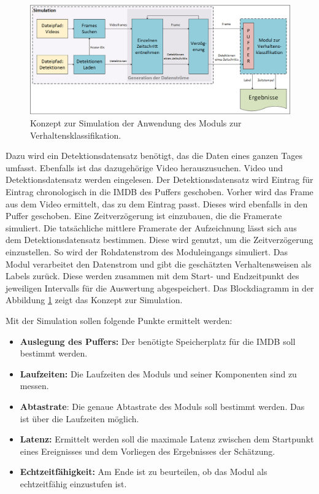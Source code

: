 \begin{figure}[htb]
    \centering
    \includegraphics[width=\textwidth]{img/Grafiken/Konzept Simultaion.png}
    \caption[Konzept zur Simulation der Anwendung des Moduls zur Verhaltensklassifikation.]{Konzept zur Simulation der Anwendung des Moduls zur Verhaltensklassifikation.}
    \label{fig:ModulKonzeptSim}
\end{figure}

Dazu wird ein Detektionsdatensatz benötigt, das die Daten eines ganzen Tages umfasst. Ebenfalls ist das dazugehörige Video herauszusuchen. Video und Detektionsdatensatz werden eingelesen. Der Detektionsdatensatz wird Eintrag für Eintrag chronologisch in die \gls{IMDB} des Puffers geschoben. Vorher wird das Frame aus dem Video ermittelt, das zu dem Eintrag passt. Dieses wird ebenfalls in den Puffer geschoben. Eine Zeitverzögerung ist einzubauen, die die Framerate simuliert. Die tatsächliche mittlere Framerate der Aufzeichnung lässt sich aus dem Detektionsdatensatz bestimmen. Diese wird genutzt, um die Zeitverzögerung einzustellen. So wird der Rohdatenstrom des Moduleingangs simuliert. Das Modul verarbeitet den Datenstrom und gibt die geschätzten Verhaltensweisen als Labels zurück. Diese werden zusammen mit dem Start- und Endzeitpunkt des jeweiligen Intervalls für die Auswertung abgespeichert. Das Blockdiagramm in der Abbildung \ref{fig:ModulKonzeptSim} zeigt das Konzept zur Simulation. 

\begin{samepage}
Mit der Simulation sollen folgende Punkte ermittelt werden:

\begin{itemize}
    \item \textbf{Auslegung des Puffers:} Der benötigte Speicherplatz für die \gls{IMDB} soll bestimmt werden.
    \item \textbf{Laufzeiten:} Die Laufzeiten des Moduls und seiner Komponenten sind zu messen.
    \item \textbf{Abtastrate}: Die genaue Abtastrate des Moduls soll bestimmt werden. Das ist über die Laufzeiten möglich.
    \item \textbf{Latenz:} Ermittelt werden soll die maximale Latenz zwischen dem Startpunkt eines Ereignisses und dem Vorliegen des Ergebnisses der Schätzung.
    \item \textbf{Echtzeitfähigkeit:} Am Ende ist zu beurteilen, ob das Modul als echtzeitfähig einzustufen ist.
\end{itemize}
\end{samepage}
